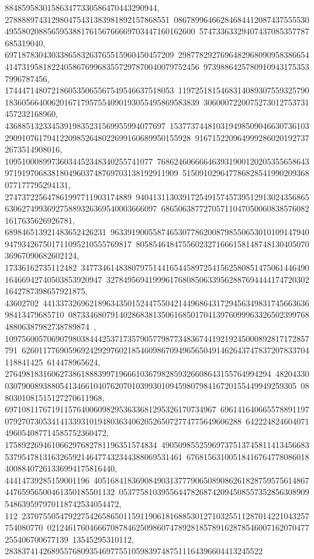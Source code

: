 {{{884859583015863477330586470443290944, 278888974312980475431383981892157868551\
08678996466284684412087437555530495580208856595388176156766669703447160162600\
57473363329407437085357787685319040, 6971878304303386583263765515960450457209\
29877829276964829680909583866544147319581822405867699683557297870040079752456\
97398864257809109431753537996787456, 1744471480721860535065567549546637518053\
11972518154683140893075593257901836056640062016717957554090193055495869583839\
3060007220075273012753731457232168960, 43688513233453919835231569955994077697\
15377374481031949850904663073610329091076179412209852648022699160689950155928\
9167152209649992860201927372673514908016, 10951000899736034452348340255741077\
76862460666646393190012020535565864397191970683818049603748769703138192911909\
515091029647786828541990209368077177795294131, 274737225647861997711903174889\
94041311303917254915745739512913024356865630627499369275889326369540003666097\
686506387727057110470500608385760821617635626926781, 689846513921483652426231\
96339190055874653077862008798550653010109147940947934267501711095210555769817\
8058546484755602327166615814874813040507036967090682602124, 17336162735112482\
34773461483807975144165445897254156258085147506144649016466942740503853920947\
3278495694199961768085063395628876944441747203021642787398657921875, 43602702\
44133732696218963435015244755042144968643172945634983174566363698413479685710\
08733468079140286838135061685017041397609996332650239976848806387982738789874\
, 109756005706907980384442537173579057798773483674419219245000892817172857791\
62601177690596924292976021854609867094965650491462643747837207833704118841425\
614478965624, 276498183160627386188839971966610367982859326608643155764994294\
48204330030790089388054134661040762070103993010945980798416720155449949259305\
0880301081515127270611968, 69710811767191157640060982953633681295326170734967\
69614164066557889119707927073053414133931019480363406205265072774775649606288\
642224824604071496054087714585752360472, 175892269461066297682781196351574834\
49050985525969737513745811413456683537954781316326592146477432344388069531461\
6768156310051841676477808601840088407261336994175816440, 44414739285159001196\
40516841836908490313777906508908626182875957561486744765956500461350185501132\
053775810395564478268742094508557352856308909548639597970118742534054472, 112\
23707550547922754265865011591190618168853012710325511287014221043257754080770\
02124617604666708784625098607478928185789162878546007162070477255406700677139\
13545295310112, 2838374142689557680935469775510598397487511164396604413245522\
}}}
